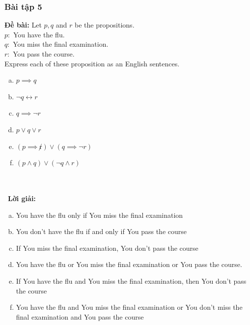 \documentclass[a4paper]{article}
\begin{document}
\subsubsection{Bài tập 5}
\textbf{Đề bài:} Let $p,q$ and $r$ be the propositions.\\
$p:$ You have the flu.\\
$q:$ You miss the final examination.\\
$r:$ You pass the course.\\
Express each of these proposition as an English sentences.
\begin{enumerate}[a)]
\item $p \implies q$
\item $\lnot q \leftrightarrow r$
\item $q \implies \lnot r$
\item $p \lor q \lor r$
\item $(p \implies \not r) \lor (q \implies \lnot r)$
\item $(p \land q) \lor (\lnot q \land r)$
\end{enumerate}
\\\ \\\
\textbf{Lời giải:} \begin{enumerate}[a)]
\item You have the flu only if You miss the final examination
\item You don't have the flu if and only if You pass the course
\item If You miss the final examination, You don't pass the course 
\item You have the flu or You miss the final examination or You pass the course.
\item If You have the flu and You miss the final examination, then You don't pass the course
\item You have the flu and You miss the final examination or You don't miss the final examination and You pass the course
\end{enumerate}
 \\\ \\\
\clearpage
\end{document}
